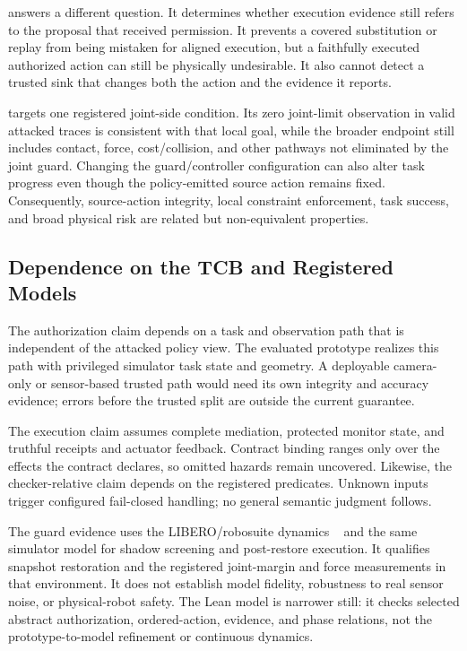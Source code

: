 \transactionbinding answers a different question.  It determines whether
execution evidence still refers to the proposal that received permission.  It prevents a covered
substitution or replay from being mistaken for aligned execution, but a faithfully
executed authorized action can still be physically undesirable.  It also cannot
detect a trusted sink that changes both the action and the evidence it reports.

\guardscreening targets one registered joint-side condition.  Its zero
joint-limit observation in valid attacked \ltwoenabled traces is consistent with that
local goal, while the broader endpoint still includes contact, force,
cost/collision, and other pathways not eliminated by the joint guard.  Changing
the guard/controller configuration can also alter task progress even though the
policy-emitted source action remains fixed.  Consequently, source-action
integrity, local constraint enforcement, task success, and broad physical risk
are related but non-equivalent properties.

\subsection{Dependence on the TCB and Registered Models}

The authorization claim depends on a task and observation path that is
independent of the attacked policy view.  The evaluated prototype realizes this
path with privileged simulator task state and geometry.  A deployable camera-only
or sensor-based trusted path would need its own integrity and accuracy evidence;
errors before the trusted split are outside the current guarantee.

The execution claim assumes complete mediation, protected monitor state, and
truthful receipts and actuator feedback.  Contract binding ranges only over the
effects the contract declares, so omitted hazards remain uncovered.  Likewise,
the checker-relative claim depends on the registered predicates.  Unknown
inputs trigger configured fail-closed handling; no general semantic judgment
follows.

The guard evidence uses the LIBERO/robosuite dynamics
~\cite{robosuite2020} and the same simulator model for shadow screening and
post-restore execution.  It qualifies snapshot restoration and the registered
joint-margin and force measurements in that environment.  It does not establish
model fidelity, robustness to real sensor noise, or physical-robot safety.  The
Lean model is narrower still: it checks selected abstract authorization,
ordered-action, evidence, and phase relations, not the prototype-to-model
refinement or continuous dynamics.

